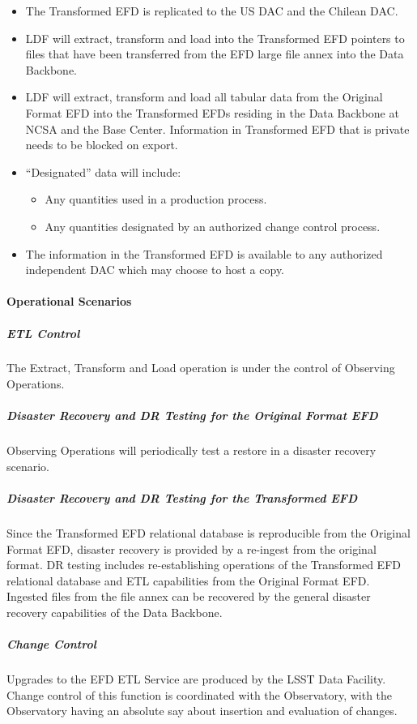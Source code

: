\begin{itemize}
\item The Transformed EFD is replicated to the US DAC and the Chilean DAC.
\item LDF will extract, transform and load into the Transformed EFD pointers to files
that have been transferred from the EFD large file annex into the Data Backbone.
\item LDF will extract, transform and load all tabular data from the
Original Format EFD into the Transformed EFDs residing in the Data Backbone at
NCSA and the Base Center. Information in Transformed EFD that is private needs to be blocked on export.  
\item “Designated” data will include:
  \begin{itemize}
  \item Any quantities used in a production process.
  \item Any quantities designated by an authorized change control process.
  \end{itemize}
\item The information in the Transformed EFD is available to any authorized independent
DAC which may choose to host a copy.
\end{itemize}

\paragraph{Operational Scenarios}

\subparagraph{ETL Control}

The Extract, Transform and Load operation is under the control of Observing Operations.

\subparagraph{Disaster Recovery and DR Testing for the Original Format EFD}

Observing Operations will periodically test a restore in a disaster recovery scenario.

\subparagraph{Disaster Recovery and DR Testing for the Transformed EFD}

Since the Transformed EFD relational database is reproducible from the
Original Format EFD, disaster recovery is provided by a re-ingest from the
original format. DR testing includes re-establishing operations of the Transformed
EFD relational database and ETL capabilities from the Original Format EFD. Ingested
files from the file annex can be recovered by the general disaster recovery capabilities
of the Data Backbone.

\subparagraph{Change Control}

Upgrades to the EFD ETL Service are produced by the LSST Data Facility.
Change control of this function is coordinated with the Observatory, with the
Observatory having an absolute say about insertion and evaluation of changes.
